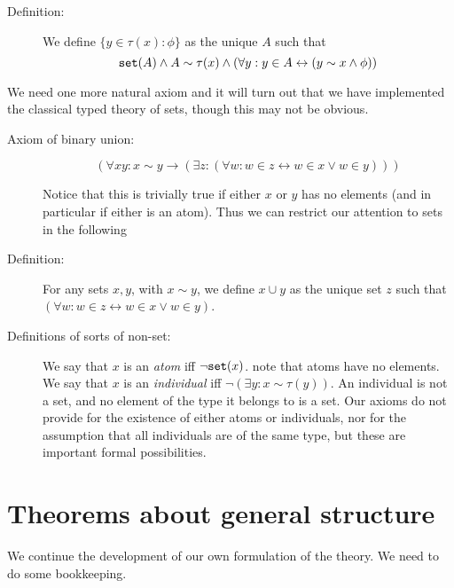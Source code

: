 \documentclass[12pt]{article}
\begin{document}
\begin{description}
\item[Definition:]  We define $\{y \in \tau(x):\phi\}$ as the unique $A$ such that $${\tt set}(A) \wedge A \sim \tau(x) \wedge (\forall y:y \in A \leftrightarrow (y \sim x \wedge \phi))$$

\end{description}


We need one more natural axiom and it will turn out that we have implemented the classical typed theory of sets, though this may not be obvious.

\begin{description}

\item[Axiom of binary union:]  $$(\forall xy: x \sim y \rightarrow (\exists z:(\forall w:w \in z \leftrightarrow w \in x \vee w \in y)))$$

Notice that this is trivially true if either $x$ or $y$ has no elements (and in particular if either is an atom).  Thus we can restrict our attention to sets in the following


\item[Definition:]  For any sets $x,y$, with $x \sim y$, we define $x \cup y$ as the unique set $z$ such that $(\forall w:w \in z \leftrightarrow w \in x \vee w \in y)$.  
\item[Definitions of sorts of non-set:]  We say that $x$ is an {\em atom\/} iff $\neg {\tt set}(x)$.  note that atoms have no elements.  We say that $x$ is an {\em individual\/} iff $\neg(\exists y:x \sim \tau(y))$.  An individual is not a set, and no element of the type it belongs to is a set.  Our axioms do not provide for the existence of either atoms or individuals, nor for the assumption that all individuals are of the same type,  but these are important formal possibilities.



\end{description}


\section{Theorems about general structure}

We continue the development of our own formulation of the theory.  We need to do some bookkeeping.
\end{document}
